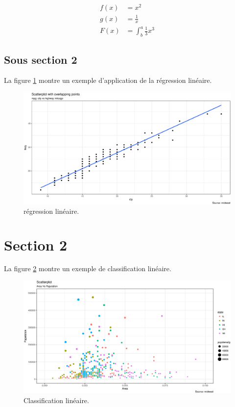 \begin{align*}
  f(x) &= x^2\\
  g(x) &= \frac{1}{x}\\
  F(x) &= \int^a_b \frac{1}{3}x^3
\end{align*}


\subsection{Sous section 2}

La figure \ref{fig:linear_regression} montre un exemple d'application de la régression linéaire.

\begin{figure}[H]
	\includegraphics[width=1.0\textwidth,height=0.4\textheight]{Figures/chap1/linear_regression.eps}
	\caption{régression linéaire.}
	\label{fig:linear_regression} 
\end{figure}


\section{Section 2}

La figure \ref{fig:logistic_regression} montre un exemple de classification linéaire.

\begin{figure}[H]
	\includegraphics[width=1.0\textwidth,height=0.4\textheight]{Figures/chap1/logistic_regression.eps}
	\caption{Classification linéaire.}
	\label{fig:logistic_regression} 
\end{figure}

